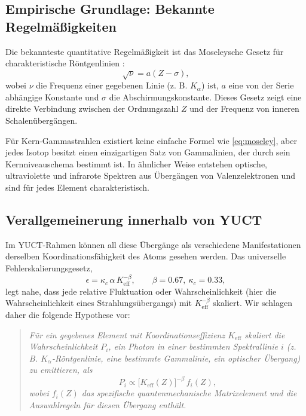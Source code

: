 \documentclass[12pt,a4paper]{article}
\begin{document}
	\subsection{Empirische Grundlage: Bekannte Regelmäßigkeiten}
	
	Die bekannteste quantitative Regelmäßigkeit ist das Moseleysche Gesetz für charakteristische Röntgenlinien \cite{Moseley1913}:
	\begin{equation}
		\sqrt{\nu} = a (Z - \sigma),
		\label{eq:moseley}
	\end{equation}
	wobei \(\nu\) die Frequenz einer gegebenen Linie (z. B. \(K_\alpha\)) ist, \(a\) eine von der Serie abhängige Konstante und \(\sigma\) die Abschirmungskonstante. Dieses Gesetz zeigt eine direkte Verbindung zwischen der Ordnungszahl \(Z\) und der Frequenz von inneren Schalenübergängen.
	
	Für Kern-Gammastrahlen existiert keine einfache Formel wie \eqref{eq:moseley}, aber jedes Isotop besitzt einen einzigartigen Satz von Gammalinien, der durch sein Kernniveauschema bestimmt ist. In ähnlicher Weise entstehen optische, ultraviolette und infrarote Spektren aus Übergängen von Valenzelektronen und sind für jedes Element charakteristisch.
	
	\subsection{Verallgemeinerung innerhalb von YUCT}
	
	Im YUCT-Rahmen können all diese Übergänge als verschiedene Manifestationen derselben Koordinationsfähigkeit des Atoms gesehen werden. Das universelle Fehlerskalierungsgesetz,
	\begin{equation}
		\epsilon = \kappa_c \, \alpha \, K_{\mathrm{eff}}^{-\beta}, \qquad \beta = 0.67,\ \kappa_c = 0.33,
		\label{eq:universal_law}
	\end{equation}
	legt nahe, dass jede relative Fluktuation oder Wahrscheinlichkeit (hier die Wahrscheinlichkeit eines Strahlungsübergangs) mit \(K_{\mathrm{eff}}^{-\beta}\) skaliert. Wir schlagen daher die folgende Hypothese vor:
	
	\begin{quote}
		\emph{Für ein gegebenes Element mit Koordinationseffizienz \(K_{\mathrm{eff}}\) skaliert die Wahrscheinlichkeit \(P_i\), ein Photon in einer bestimmten Spektrallinie \(i\) (z. B. \(K_\alpha\)-Röntgenlinie, eine bestimmte Gammalinie, ein optischer Übergang) zu emittieren, als}
		\begin{equation}
			P_i \propto \bigl[K_{\mathrm{eff}}(Z)\bigr]^{-\beta} \, f_i(Z),
			\label{eq:prob_scaling}
		\end{equation}
		\emph{wobei \(f_i(Z)\) das spezifische quantenmechanische Matrixelement und die Auswahlregeln für diesen Übergang enthält.}
	\end{quote}
	
\end{document}
